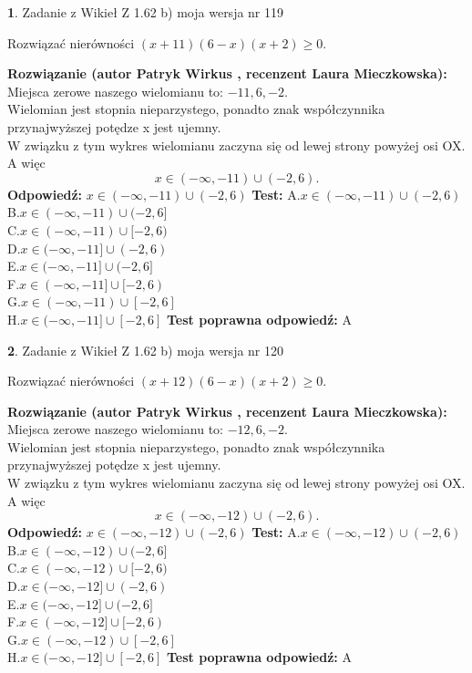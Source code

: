 \documentclass[12pt, a4paper]{article}
\theoremstyle{definition} %
\newtheorem{zad}{}
\newcommand{\zadStart}[1]{\begin{zad}#1\newline}
\newcommand{\zadStop}{\end{zad}}
\newcommand{\rozwStart}[2]{\noindent \textbf{Rozwiązanie (autor #1 , recenzent #2): }\newline}
\newcommand{\rozwStop}{\newline}
\newcommand{\odpStart}{\noindent \textbf{Odpowiedź:}\newline}
\newcommand{\odpStop}{\newline}
\newcommand{\testStart}{\noindent \textbf{Test:}\newline}
\newcommand{\testStop}{\newline}
\newcommand{\kluczStart}{\noindent \textbf{Test poprawna odpowiedź:}\newline}
\newcommand{\kluczStop}{\newline}
\begin{document}
\zadStart{Zadanie z Wikieł Z 1.62 b) moja wersja nr 119}

Rozwiązać nierówności $(x+11)(6-x)(x+2)\ge0$.
\zadStop
\rozwStart{Patryk Wirkus}{Laura Mieczkowska}
Miejsca zerowe naszego wielomianu to: $-11, 6, -2$.\\
Wielomian jest stopnia nieparzystego, ponadto znak współczynnika przy\linebreak najwyższej potędze x jest ujemny.\\ W związku z tym wykres wielomianu zaczyna się od lewej strony powyżej osi OX. A więc $$x \in (-\infty,-11) \cup (-2,6).$$
\rozwStop
\odpStart
$x \in (-\infty,-11) \cup (-2,6)$
\odpStop
\testStart
A.$x \in (-\infty,-11) \cup (-2,6)$\\
B.$x \in (-\infty,-11) \cup (-2,6]$\\
C.$x \in (-\infty,-11) \cup [-2,6)$\\
D.$x \in (-\infty,-11] \cup (-2,6)$\\
E.$x \in (-\infty,-11] \cup (-2,6]$\\
F.$x \in (-\infty,-11] \cup [-2,6)$\\
G.$x \in (-\infty,-11) \cup [-2,6]$\\
H.$x \in (-\infty,-11] \cup [-2,6]$
\testStop
\kluczStart
A
\kluczStop



\zadStart{Zadanie z Wikieł Z 1.62 b) moja wersja nr 120}

Rozwiązać nierówności $(x+12)(6-x)(x+2)\ge0$.
\zadStop
\rozwStart{Patryk Wirkus}{Laura Mieczkowska}
Miejsca zerowe naszego wielomianu to: $-12, 6, -2$.\\
Wielomian jest stopnia nieparzystego, ponadto znak współczynnika przy\linebreak najwyższej potędze x jest ujemny.\\ W związku z tym wykres wielomianu zaczyna się od lewej strony powyżej osi OX. A więc $$x \in (-\infty,-12) \cup (-2,6).$$
\rozwStop
\odpStart
$x \in (-\infty,-12) \cup (-2,6)$
\odpStop
\testStart
A.$x \in (-\infty,-12) \cup (-2,6)$\\
B.$x \in (-\infty,-12) \cup (-2,6]$\\
C.$x \in (-\infty,-12) \cup [-2,6)$\\
D.$x \in (-\infty,-12] \cup (-2,6)$\\
E.$x \in (-\infty,-12] \cup (-2,6]$\\
F.$x \in (-\infty,-12] \cup [-2,6)$\\
G.$x \in (-\infty,-12) \cup [-2,6]$\\
H.$x \in (-\infty,-12] \cup [-2,6]$
\testStop
\kluczStart
A
\kluczStop
\end{document}
